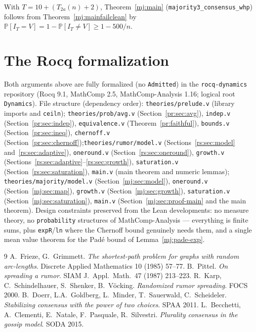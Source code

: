 With $T = 10+(T_{2a}(n)+2)$, Theorem~\ref{mj:main}
(\texttt{majority3\_consensus\_whp}) follows from
Theorem~\ref{mj:mainfailclean} by
$\mathbb{P}[I_T=V] = 1-\mathbb{P}[I_T\ne V] \ge 1-500/n$.

\section*{The Rocq formalization}

Both arguments above are fully formalized (no \texttt{Admitted}) in the
\texttt{rocq-dynamics} repository (Rocq 9.1, MathComp 2.5,
MathComp-Analysis 1.16; logical root \texttt{Dynamics}). File structure
(dependency order): \texttt{theories/prelude.v} (library imports and
\texttt{ceiln}); \texttt{theories/prob/avg.v}
(Section~\ref{pr:sec:avg}), \texttt{indep.v} (Section~\ref{pr:sec:indep}),
\texttt{equivalence.v} (Theorem~\ref{pr:faithful}),
\texttt{bounds.v} (Section~\ref{pr:sec:ineq}), \texttt{chernoff.v}
(Section~\ref{pr:sec:chernoff});\texttt{theories/rumor/model.v}
(Sections~\ref{rs:sec:model} and~\ref{rs:sec:adaptive}), \texttt{oneround.v}
(Section~\ref{rs:sec:oneround}), \texttt{growth.v}
(Sections~\ref{rs:sec:adaptive}--\ref{rs:sec:growth}),
\texttt{saturation.v} (Section~\ref{rs:sec:saturation}), \texttt{main.v}
(main theorem and numeric lemmas); \texttt{theories/majority/model.v}
(Section~\ref{mj:sec:model}), \texttt{oneround.v} (Section~\ref{mj:sec:map}),
\texttt{growth.v} (Section~\ref{mj:sec:growth}), \texttt{saturation.v}
(Section~\ref{mj:sec:saturation}), \texttt{main.v}
(Section~\ref{mj:sec:proof-main} and the main theorem). Design constraints
preserved from the Lean developments: no measure theory, no
\texttt{probability} structures of MathComp-Analysis --- everything is finite
sums, plus \texttt{expR}/\texttt{ln} where the Chernoff bound genuinely
needs them, and a single mean value theorem for the Pad\'e bound of
Lemma~\ref{mj:pade-exp}.

\begin{thebibliography}{9}
 A.~Frieze, G.~Grimmett.
\emph{The shortest-path problem for graphs with random arc-lengths}.
Discrete Applied Mathematics 10 (1985) 57--77.
 B.~Pittel.
\emph{On spreading a rumor}. SIAM J.\ Appl.\ Math.\ 47 (1987) 213--223.
 R.~Karp, C.~Schindelhauer, S.~Shenker, B.~V\"ocking.
\emph{Randomized rumor spreading}. FOCS 2000.
 B.~Doerr, L.A.~Goldberg, L.~Minder, T.~Sauerwald,
C.~Scheideler. \emph{Stabilizing consensus with the power of two choices}.
SPAA 2011.
 L.~Becchetti, A.~Clementi, E.~Natale, F.~Pasquale,
R.~Silvestri. \emph{Plurality consensus in the gossip model}. SODA 2015.
\end{thebibliography}
